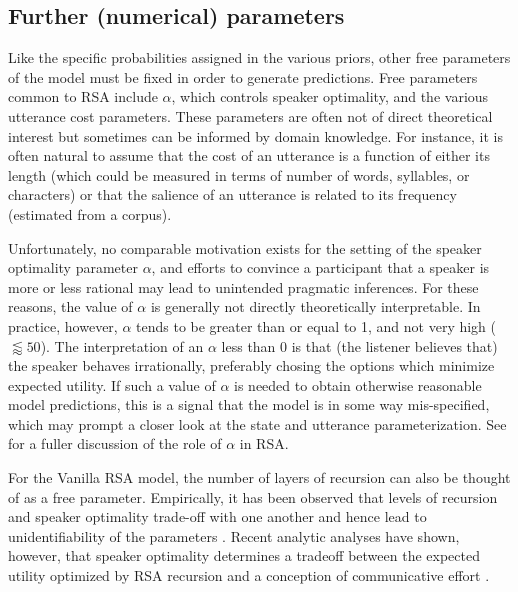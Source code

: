 \documentclass{sp}
\newcommand{\mht}[1]{\textcolor{purple}{[mht: #1]}}
\begin{document}

%


\subsection{Further (numerical) parameters}

Like the specific probabilities assigned in the various priors, other free parameters of the model must be fixed in order to generate predictions. Free parameters common to RSA include $\alpha$, which controls speaker optimality, and the various utterance cost parameters. These parameters are often not of direct theoretical interest but sometimes can be informed by domain knowledge. For instance, it is often natural to assume that the cost of an utterance is a function of either its length  (which could be measured in terms of number of words, syllables, or characters) or that the salience of an utterance is related to its frequency (estimated from a corpus).

Unfortunately,  no comparable motivation exists for the setting of the speaker optimality parameter $\alpha$, and efforts to convince a participant that a speaker is more or less rational may lead to unintended pragmatic inferences. For these reasons, the value of $\alpha$ is generally not directly theoretically interpretable. In practice, however, $\alpha$ tends to be greater than or equal to 1, and not very high ($\lessapprox 50$). The interpretation of an $\alpha$ less than 0 is that (the listener believes that) the speaker behaves irrationally, preferably chosing the options which minimize expected utility. If such a value of $\alpha$ is needed to obtain otherwise reasonable model predictions, this is a signal that the model is in some way mis-specified, which may prompt a closer look at the state and utterance parameterization.  See \cite{zaslavsky2020rate} for a fuller discussion of the role of $\alpha$ in RSA.

For the Vanilla RSA model, the number of layers of recursion can also be thought of as a free parameter. Empirically, it has been observed that levels of recursion and speaker optimality trade-off with one another  and hence lead to unidentifiability of the parameters \citep{frank2016rational}. Recent analytic analyses have shown, however, that speaker optimality determines a tradeoff between the expected utility optimized by RSA recursion and a conception of communicative effort \citep{zaslavsky2020rate}.
\end{document}

